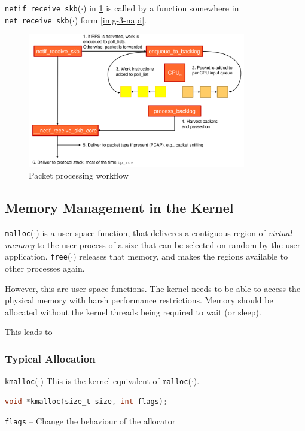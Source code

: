 \documentclass[english]{panikzettel}
\newcommand{\fkt}[1]{\texttt{#1}(\(\cdot\))}
\begin{document}
	\fkt{netif\_receive\_skb} in \cref{img-3-packet-processing-workflow} is called by a function somewhere in \fkt{net\_receive\_skb} form \cref{img-3-napi}.

	\begin{figure}[H]
		\centering
		\includegraphics[width=0.85\textwidth]{img/3-packet-processing-workflow.png}
		\caption{Packet processing workflow}
		\label{img-3-packet-processing-workflow}
	\end{figure}

	\subsection{Memory Management in the Kernel}
	\label{ss-kernel-networking-memory-allocation-in-the-kernel}
	
	\fkt{malloc} is a user-space function, that deliveres a contiguous region of \textit{virtual memory} to the user process of a size that can be selected on random by the user application.	
	\fkt{free} releases that memory, and makes the regions available to other processes again.

	However, this are user-space functions. The kernel needs to be able to access the physical memory with harsh performance restrictions. 
	Memory should be allocated without the kernel threads being required to wait (or sleep).

	This leads to 

	\subsubsection{Typical Allocation}
	\label{sss:memory-allocation-in-the-kernel:typical-allocation}

	\begin{defi}{\fkt{kmalloc}}
		This is the kernel equivalent of \fkt{malloc}.
		\begin{lstlisting}[language=C]
			void *kmalloc(size_t size, int flags);
		\end{lstlisting}
		\tcblower
		\texttt{flags} – Change the behaviour of the allocator
	\end{defi}
\end{document}
